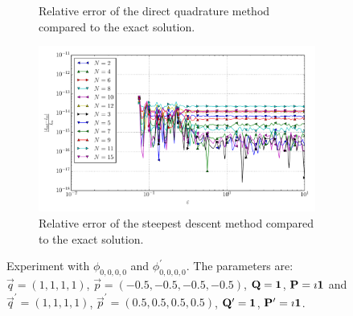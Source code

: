 \documentclass[a4paper,10pt]{article}
\begin{document}
\begin{figure}[ht!]
\begin{subfigure}[t]{0.5\linewidth}
    \caption{Relative error of the direct quadrature method compared to the exact solution.}
    \label{fig:tp_4d_conv_eps_0000_0000_err_qr}
  \end{subfigure}
  \begin{subfigure}[t]{0.5\linewidth}
    \includegraphics[width=\linewidth]{./plots/tp_4d_conv_eps_(0,0,0,0)_(0,0,0,0)_err_rel_nsd.pdf}
    \caption{Relative error of the steepest descent method compared to the exact solution.}
    \label{fig:tp_4d_conv_eps_0000_0000_err_nsd}
  \end{subfigure}
  \label{fig:tp_4d_conv_eps_0000_0000}
  \caption{Experiment with $\phi_{0,0,0,0}$ and $\phi_{0,0,0,0}^{\prime}$.
  The parameters are:
  $\vec{q} = (1, 1, 1, 1)$,
  $\vec{p} = (-0.5, -0.5, -0.5, -0.5)$,
  $\mathbf{Q} = \mathbf{1}$,
  $\mathbf{P} = \imath \mathbf{1}$
  and
  $\vec{q}^\prime = (1, 1, 1, 1)$,
  $\vec{p}^\prime = (0.5, 0.5, 0.5, 0.5)$,
  $\mathbf{Q}^\prime = \mathbf{1}$,
  $\mathbf{P}^\prime = \imath \mathbf{1}$.}
\end{figure}
\end{document}
